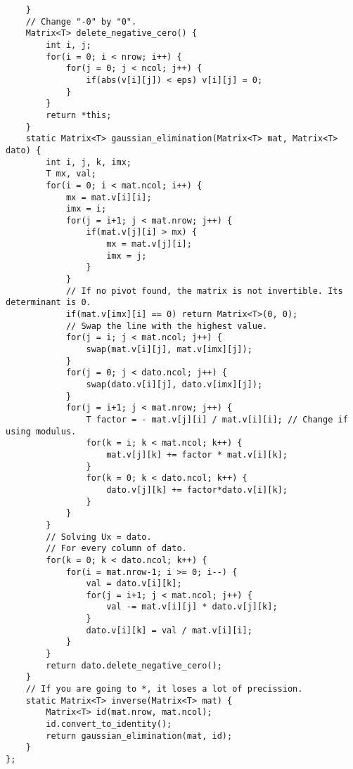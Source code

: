 \documentclass[a4paper,10pt]{article}
\begin{document}
\begin{multicols}{2}
\begin{verbatim}
    }
    // Change "-0" by "0".
    Matrix<T> delete_negative_cero() {
        int i, j;
        for(i = 0; i < nrow; i++) {
            for(j = 0; j < ncol; j++) {
                if(abs(v[i][j]) < eps) v[i][j] = 0;
            }
        }
        return *this;
    }
    static Matrix<T> gaussian_elimination(Matrix<T> mat, Matrix<T> dato) {
        int i, j, k, imx;
        T mx, val;
        for(i = 0; i < mat.ncol; i++) {
            mx = mat.v[i][i];
            imx = i;
            for(j = i+1; j < mat.nrow; j++) {
                if(mat.v[j][i] > mx) {
                    mx = mat.v[j][i];
                    imx = j;
                }
            }
            // If no pivot found, the matrix is not invertible. Its determinant is 0.
            if(mat.v[imx][i] == 0) return Matrix<T>(0, 0);
            // Swap the line with the highest value.
            for(j = i; j < mat.ncol; j++) {
                swap(mat.v[i][j], mat.v[imx][j]);
            }
            for(j = 0; j < dato.ncol; j++) {
                swap(dato.v[i][j], dato.v[imx][j]);
            }
            for(j = i+1; j < mat.nrow; j++) {
                T factor = - mat.v[j][i] / mat.v[i][i]; // Change if using modulus.
                for(k = i; k < mat.ncol; k++) {
                    mat.v[j][k] += factor * mat.v[i][k];
                }
                for(k = 0; k < dato.ncol; k++) {
                    dato.v[j][k] += factor*dato.v[i][k];
                }
            }
        }
        // Solving Ux = dato.
        // For every column of dato.
        for(k = 0; k < dato.ncol; k++) {
            for(i = mat.nrow-1; i >= 0; i--) {
                val = dato.v[i][k];
                for(j = i+1; j < mat.ncol; j++) {
                    val -= mat.v[i][j] * dato.v[j][k];
                }
                dato.v[i][k] = val / mat.v[i][i];
            }
        }
        return dato.delete_negative_cero();
    }
    // If you are going to *, it loses a lot of precission.
    static Matrix<T> inverse(Matrix<T> mat) {
        Matrix<T> id(mat.nrow, mat.ncol);
        id.convert_to_identity();
        return gaussian_elimination(mat, id);
    }
};
\end{verbatim}
\end{multicols}
\end{document}
